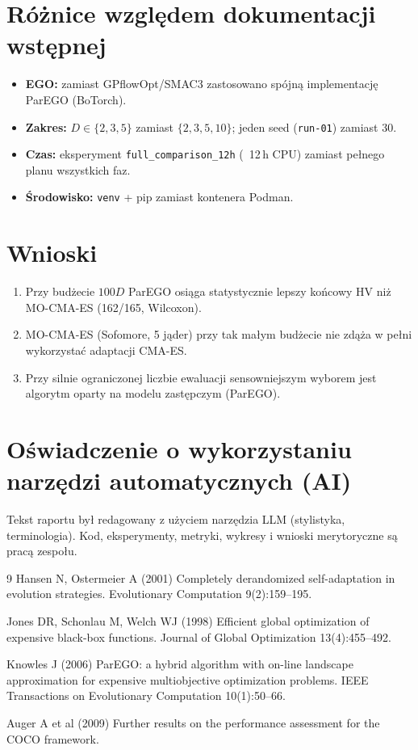 \documentclass[default]{sn-jnl}
\begin{document}
\section{Różnice względem dokumentacji wstępnej}\label{sec:roznice}

\begin{itemize}[noitemsep]
  \item \textbf{EGO:} zamiast GPflowOpt/SMAC3 zastosowano spójną implementację ParEGO (BoTorch).
  \item \textbf{Zakres:} $D \in \{2,3,5\}$ zamiast $\{2,3,5,10\}$; jeden seed (\texttt{run-01}) zamiast 30.
  \item \textbf{Czas:} eksperyment \texttt{full\_comparison\_12h} (~12\,h CPU) zamiast pełnego planu wszystkich faz.
  \item \textbf{Środowisko:} \texttt{venv} + pip zamiast kontenera Podman.
\end{itemize}

\section{Wnioski}\label{sec:wnioski}

\begin{enumerate}[noitemsep]
  \item Przy budżecie $100D$ ParEGO osiąga statystycznie lepszy końcowy HV niż MO-CMA-ES (162/165, Wilcoxon).
  \item MO-CMA-ES (Sofomore, 5 jąder) przy tak małym budżecie nie zdąża w pełni wykorzystać adaptacji CMA-ES.
  \item Przy silnie ograniczonej liczbie ewaluacji sensowniejszym wyborem jest algorytm oparty na modelu zastępczym (ParEGO).
\end{enumerate}

\section{Oświadczenie o wykorzystaniu narzędzi automatycznych (AI)}\label{sec:ai}

Tekst raportu był redagowany z użyciem narzędzia LLM (stylistyka, terminologia).
Kod, eksperymenty, metryki, wykresy i wnioski merytoryczne są pracą zespołu.

\begin{thebibliography}{9}
  Hansen N, Ostermeier A (2001) Completely derandomized self-adaptation in evolution strategies. Evolutionary Computation 9(2):159--195.

  Jones DR, Schonlau M, Welch WJ (1998) Efficient global optimization of expensive black-box functions. Journal of Global Optimization 13(4):455--492.

  Knowles J (2006) ParEGO: a hybrid algorithm with on-line landscape approximation for expensive multiobjective optimization problems. IEEE Transactions on Evolutionary Computation 10(1):50--66.

  Auger A et al (2009) Further results on the performance assessment for the COCO framework.
\end{thebibliography}
\end{document}
